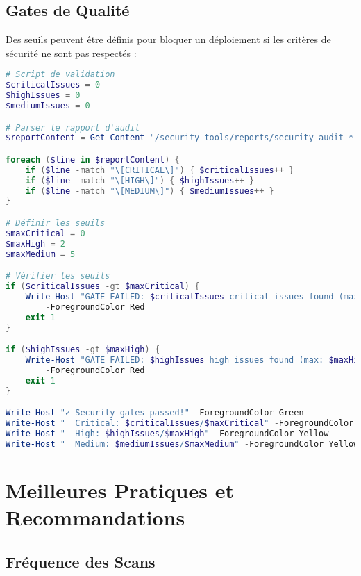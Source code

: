 \subsection{Gates de Qualité}

Des seuils peuvent être définis pour bloquer un déploiement si les critères de sécurité ne sont pas respectés :

\begin{lstlisting}[language=PowerShell, caption=Validation des Gates de Qualité]
# Script de validation
$criticalIssues = 0
$highIssues = 0
$mediumIssues = 0

# Parser le rapport d'audit
$reportContent = Get-Content "/security-tools/reports/security-audit-*.txt"

foreach ($line in $reportContent) {
    if ($line -match "\[CRITICAL\]") { $criticalIssues++ }
    if ($line -match "\[HIGH\]") { $highIssues++ }
    if ($line -match "\[MEDIUM\]") { $mediumIssues++ }
}

# Définir les seuils
$maxCritical = 0
$maxHigh = 2
$maxMedium = 5

# Vérifier les seuils
if ($criticalIssues -gt $maxCritical) {
    Write-Host "GATE FAILED: $criticalIssues critical issues found (max: $maxCritical)" `
        -ForegroundColor Red
    exit 1
}

if ($highIssues -gt $maxHigh) {
    Write-Host "GATE FAILED: $highIssues high issues found (max: $maxHigh)" `
        -ForegroundColor Red
    exit 1
}

Write-Host "✓ Security gates passed!" -ForegroundColor Green
Write-Host "  Critical: $criticalIssues/$maxCritical" -ForegroundColor Green
Write-Host "  High: $highIssues/$maxHigh" -ForegroundColor Yellow
Write-Host "  Medium: $mediumIssues/$maxMedium" -ForegroundColor Yellow
\end{lstlisting}

\section{Meilleures Pratiques et Recommandations}

\subsection{Fréquence des Scans}

